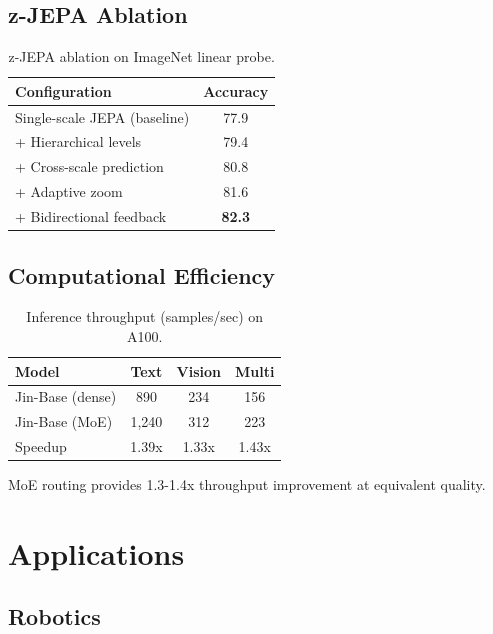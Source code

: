 \documentclass[11pt,twocolumn]{article}
\begin{document}
\subsection{z-JEPA Ablation}

\begin{table}[h]
\centering
\caption{z-JEPA ablation on ImageNet linear probe.}
\label{tab:zjepa_ablation}
\begin{tabular}{lc}
\toprule
\textbf{Configuration} & \textbf{Accuracy} \\
\midrule
Single-scale JEPA (baseline) & 77.9 \\
+ Hierarchical levels & 79.4 \\
+ Cross-scale prediction & 80.8 \\
+ Adaptive zoom & 81.6 \\
+ Bidirectional feedback & \textbf{82.3} \\
\bottomrule
\end{tabular}
\end{table}

\subsection{Computational Efficiency}

\begin{table}[h]
\centering
\caption{Inference throughput (samples/sec) on A100.}
\label{tab:throughput}
\begin{tabular}{lccc}
\toprule
\textbf{Model} & \textbf{Text} & \textbf{Vision} & \textbf{Multi} \\
\midrule
Jin-Base (dense) & 890 & 234 & 156 \\
Jin-Base (MoE) & 1,240 & 312 & 223 \\
Speedup & 1.39x & 1.33x & 1.43x \\
\bottomrule
\end{tabular}
\end{table}

MoE routing provides 1.3-1.4x throughput improvement at equivalent quality.

\section{Applications}

\subsection{Robotics}
\end{document}
